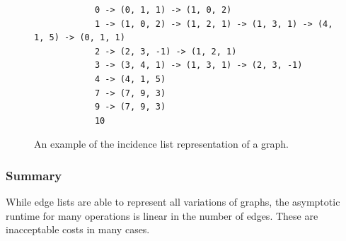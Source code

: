         \begin{figure}[htp]
         \begin{center}
          \begin{verbatim}
            0 -> (0, 1, 1) -> (1, 0, 2)
            1 -> (1, 0, 2) -> (1, 2, 1) -> (1, 3, 1) -> (4, 1, 5) -> (0, 1, 1)
            2 -> (2, 3, -1) -> (1, 2, 1)
            3 -> (3, 4, 1) -> (1, 3, 1) -> (2, 3, -1)
            4 -> (4, 1, 5)
            7 -> (7, 9, 3)
            9 -> (7, 9, 3)
            10
          \end{verbatim}
         \end{center}
         \caption{An example of the incidence list representation of a graph.}
         \label{incidencel}
        \end{figure}
        
        
        
        \subsubsection*{Summary}
        While edge lists are able to represent all variations of graphs, the asymptotic runtime for many operations is linear in the number of edges. 
        These are inacceptable costs in many cases.
        
